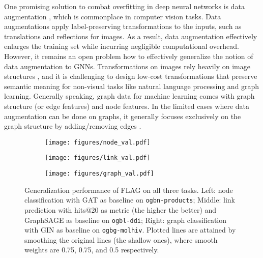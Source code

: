 \documentclass[11pt]{article}
\begin{document}
One promising solution to combat overfitting in deep neural networks is data augmentation \citep{krizhevsky2012imagenet}, which is commonplace in computer vision tasks. Data augmentations apply label-preserving transformations to the inputs, such as translations and reflections for images. As a result, data augmentation effectively enlarges the training set while incurring negligible computational overhead. However, it remains an open problem how to effectively generalize the notion of data augmentation to GNNs. Transformations on images rely heavily on image structures \citep{chen2020simple}, and it is challenging to design low-cost transformations that preserve semantic meaning for non-visual tasks like natural language processing \citep{wei2019eda} and graph learning. Generally speaking, graph data for machine learning comes with graph structure (or edge features) and node features. In the limited cases where data augmentation can be done on graphs, it generally focuses exclusively on the graph structure by adding/removing edges \citep{rong2019dropedge,hamilton2017inductive,gilmer2017neural,you2020graph,wang2020nodeaug,godwin2022simple}. 



\begin{figure*}[t]\centering
    \begin{subfigure}{.3\textwidth}
        \texttt{[image: figures/node\_val.pdf]}\end{subfigure}
    \begin{subfigure}{.3\textwidth}
        \texttt{[image: figures/link\_val.pdf]}\end{subfigure}
    \begin{subfigure}{.3\textwidth}
        \texttt{[image: figures/graph\_val.pdf]}
    \end{subfigure}
    \caption{Generalization performance of FLAG on all three tasks. Left: node classification with GAT as baseline on \texttt{ogbn-products}; Middle: link prediction with hits@20 as metric (the higher the better) and GraphSAGE as baseline on \texttt{ogbl-ddi}; Right: graph classification with GIN as baseline on \texttt{ogbg-molhiv}. Plotted lines are attained by smoothing the original lines (the shallow ones), where smooth weights are 0.75, 0.75, and 0.5 respectively.}\label{fig:loss}\end{figure*}
\end{document}
